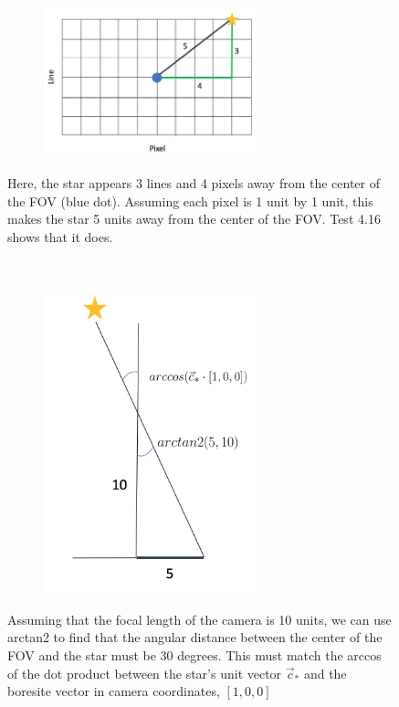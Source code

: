 \documentclass[]{DINOReportMemo}
\begin{document}
\begin{figure}[t!]
    \centering
    \begin{subfigure}
        \centering
        \includegraphics[width=2.5in]{detectorArr}
    \end{subfigure}%
    \caption{Here, the star appears 3 lines and 4 pixels away from the center of the FOV (blue dot). Assuming each pixel is 1 unit by 1 unit, this makes the star 5 units away from the center of the FOV. Test 4.16 shows that it does.}
    ~ 
    \begin{subfigure}
        \centering
        \includegraphics[width=2.5in]{projectedStar}
    \end{subfigure}
    \caption{Assuming that the focal length of the camera is 10 units, we can use arctan2 to find that the angular distance between the center of the FOV and the star must be 30 degrees. This must match the arccos of the dot product between the star's unit vector $\vec{c}_*$ and the boresite vector in camera coordinates, $[1,0,0]$}
\end{figure}
\end{document}
